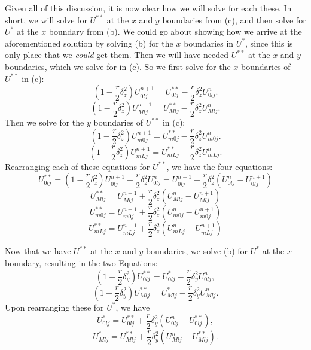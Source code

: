 \documentclass[11pt]{article}
\def\f{\frac }
\begin{document}
\begin{enumerate}
Given all of this discussion, it is now clear how we will solve for each these.
In short, we will solve for $U^{**}$ at the $x$ and $y$ boundaries from (c), and then solve for $U^*$ at the $x$ boundary from (b).
We could go about showing how we arrive at the aforementioned solution by solving (b) for the $x$ boundaries in $U^*$, since this is only place that we {\em could} get them.
Then we will have needed $U^{**}$ at the $x$ and $y$ boundaries, which we solve for in (c).
So we first solve for the $x$ boundaries of $U^{**}$ in (c):
\[ \left ( 1 - \f{r}{2}\delta _z ^2  \right ) U^{n+1}  _{0lj} = U^{**} _{0lj} - \f{r}{2} \delta _z ^2 U^n _{0lj}. \]
\[ \left ( 1 - \f{r}{2}\delta _z ^2  \right ) U^{n+1}  _{Mlj} = U^{**} _{Mlj} - \f{r}{2} \delta _z ^2 U^n _{Mlj}. \]
Then we solve for the $y$ boundaries of $U^{**}$ in (c):
\[ \left ( 1 - \f{r}{2}\delta _z ^2  \right ) U^{n+1}  _{m0j} = U^{**} _{m0j} - \f{r}{2} \delta _z ^2 U^n _{m0j}. \]
\[ \left ( 1 - \f{r}{2}\delta _z ^2  \right ) U^{n+1}  _{mLj} = U^{**} _{mLj} - \f{r}{2} \delta _z ^2 U^n _{mLj}. \]
Rearranging each of these equations for $U^{**}$, we have the four equations:
\[U^{**} _{0lj}  = \left ( 1 - \f{r}{2}\delta _z ^2  \right ) U^{n+1}  _{0lj} + \f{r}{2} \delta _z ^2 U^n _{0lj} = U^{n+1}  _{0lj} + \f{r}{2} \delta _z ^2 \left ( U^n _{0lj} - U^{n+1} _{0lj} \right ) \]
\[U^{**} _{Mlj}  = U^{n+1}  _{Mlj} + \f{r}{2} \delta _z ^2 \left ( U^n _{Mlj} - U^{n+1} _{Mlj} \right ) \]
\[U^{**} _{m0j}  = U^{n+1}  _{m0j} + \f{r}{2} \delta _z ^2 \left ( U^n _{m0j} - U^{n+1} _{m0j} \right ) \]
\[U^{**} _{mLj}  = U^{n+1}  _{mLj} + \f{r}{2} \delta _z ^2 \left ( U^n _{mLj} - U^{n+1} _{mLj} \right ) \]

Now that we have $U^{**}$ at the $x$ and $y$ boundaries, we solve (b) for $U^*$ at the $x$ boundary, resulting in the two Equations:
\[ \left ( 1 - \f{r}{2}\delta _y ^2  \right ) U^{**}  _{0lj} = U^* _{0lj} - \f{r}{2} \delta _y ^2 U^n _{0lj}, \]
\[ \left ( 1 - \f{r}{2}\delta _y ^2  \right ) U^{**}  _{Mlj} = U^* _{Mlj} - \f{r}{2} \delta _y ^2 U^n _{Mlj}. \]
Upon rearranging these for $U^*$, we have 
\[  U^* _{0lj} = U^{**}  _{0lj} + \f{r}{2} \delta _y ^2 \left ( U^n _{0lj} - U^{**} _{0lj} \right ) , \]
\[  U^* _{Mlj} = U^{**}  _{Mlj} + \f{r}{2} \delta _y ^2 \left ( U^n _{Mlj} - U^{**} _{Mlj} \right ) . \]


\end{enumerate}
\end{document}
